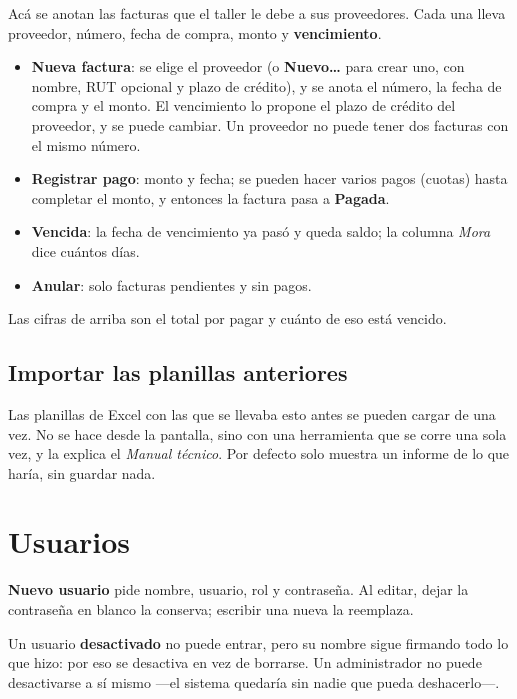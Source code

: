 \documentclass[11pt,a4paper]{article}
\begin{document}

Acá se anotan las facturas que el taller le debe a sus proveedores. Cada una
lleva proveedor, número, fecha de compra, monto y \textbf{vencimiento}.

\begin{itemize}
  \item \textbf{Nueva factura}: se elige el proveedor (o \textbf{Nuevo\ldots} para
        crear uno, con nombre, RUT opcional y plazo de crédito), y se anota el número, la fecha
        de compra y el monto. El vencimiento lo propone el plazo de crédito del
        proveedor, y se puede cambiar. Un proveedor no puede tener dos facturas
        con el mismo número.
  \item \textbf{Registrar pago}: monto y fecha; se pueden hacer varios pagos
        (cuotas) hasta completar el monto, y entonces la factura pasa a
        \textbf{Pagada}.
  \item \textbf{Vencida}: la fecha de vencimiento ya pasó y queda saldo; la
        columna \emph{Mora} dice cuántos días.
  \item \textbf{Anular}: solo facturas pendientes y sin pagos.
\end{itemize}

Las cifras de arriba son el total por pagar y cuánto de eso está vencido.

\subsection{Importar las planillas anteriores}

Las planillas de Excel con las que se llevaba esto antes se pueden cargar de una
vez. No se hace desde la pantalla, sino con una herramienta que se corre una sola
vez, y la explica el \emph{Manual técnico}. Por defecto solo muestra un informe
de lo que haría, sin guardar nada.

\section{Usuarios}


\textbf{Nuevo usuario} pide nombre, usuario, rol y contraseña. Al editar, dejar
la contraseña en blanco la conserva; escribir una nueva la reemplaza.

Un usuario \textbf{desactivado} no puede entrar, pero su nombre sigue firmando
todo lo que hizo: por eso se desactiva en vez de borrarse. Un administrador no
puede desactivarse a sí mismo —el sistema quedaría sin nadie que pueda
deshacerlo—.
\end{document}
